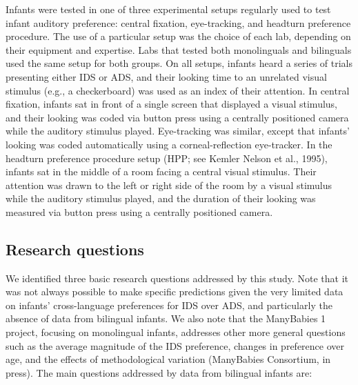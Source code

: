 \documentclass[,man,floatsintext]{apa6}
\begin{document}
Infants were tested in one of three experimental setups regularly used to test infant auditory preference: central fixation, eye-tracking, and headturn preference procedure. The use of a particular setup was the choice of each lab, depending on their equipment and expertise. Labs that tested both monolinguals and bilinguals used the same setup for both groups. On all setups, infants heard a series of trials presenting either IDS or ADS, and their looking time to an unrelated visual stimulus (e.g., a checkerboard) was used as an index of their attention. In central fixation, infants sat in front of a single screen that displayed a visual stimulus, and their looking was coded via button press using a centrally positioned camera while the auditory stimulus played. Eye-tracking was similar, except that infants' looking was coded automatically using a corneal-reflection eye-tracker. In the headturn preference procedure setup (HPP; see Kemler Nelson et al., 1995), infants sat in the middle of a room facing a central visual stimulus. Their attention was drawn to the left or right side of the room by a visual stimulus while the auditory stimulus played, and the duration of their looking was measured via button press using a centrally positioned camera.

\hypertarget{research-questions}{%
\subsection{Research questions}\label{research-questions}}

We identified three basic research questions addressed by this study. Note that it was not always possible to make specific predictions given the very limited data on infants' cross-language preferences for IDS over ADS, and particularly the absence of data from bilingual infants. We also note that the ManyBabies 1 project, focusing on monolingual infants, addresses other more general questions such as the average magnitude of the IDS preference, changes in preference over age, and the effects of methodological variation (ManyBabies Consortium, in press). The main questions addressed by data from bilingual infants are:
\end{document}
